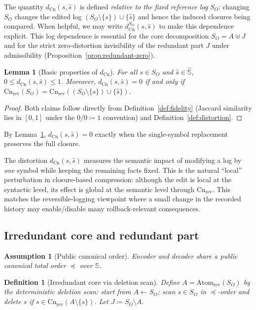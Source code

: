 \documentclass[twoside]{article}
\newtheorem{definition}[theorem]{Definition}
\newtheorem{lemma}[theorem]{Lemma}
\newtheorem{assumption}[theorem]{Assumption}
\newcommand{\Cn}{\mathrm{Cn}}
\newcommand{\Atom}{\mathrm{Atom}}
\newcommand{\1}{\mathbf{1}}
\begin{document}
The quantity \(d_{\Cn}(s,\hat s)\) is defined \emph{relative to the fixed reference log} \(S_O\): changing \(S_O\) changes the edited log
\((S_O\setminus\{s\})\cup\{\hat s\}\) and hence the induced closures being compared.
When helpful, we may write \(d_{\Cn}^{S_O}(s,\hat s)\) to make this dependence explicit.
This log dependence is essential for the core decomposition \(S_O=A\uplus J\) and for the strict zero-distortion invisibility of the redundant
part \(J\) under admissibility (Proposition~\ref{prop:redundant-zero}).

\begin{lemma}[Basic properties of \(d_{\Cn}\)]
\label{lem:dist-basic}
For all \(s\in S_O\) and \(\hat{s}\in\hat{\mathbb{S}}\), \(0\le d_{\Cn}(s,\hat{s})\le 1\).
Moreover, \(d_{\Cn}(s,\hat{s})=0\) if and only if
\(\Cn_{\mathrm{rev}}(S_O)=\Cn_{\mathrm{rev}}((S_O\setminus\{s\})\cup\{\hat{s}\})\).
\end{lemma}
\begin{proof}
Both claims follow directly from Definition~\ref{def:fidelity} (Jaccard similarity lies in \([0,1]\) under the \(0/0\coloneqq 1\) convention)
and Definition~\ref{def:distortion}.
\end{proof}

By Lemma~\ref{lem:dist-basic}, \(d_{\Cn}(s,\hat{s})=0\) exactly when the single-symbol replacement preserves the full closure.

The distortion \(d_{\Cn}(s,\hat{s})\) measures the semantic impact of modifying a log by \emph{one} symbol while keeping the remaining facts fixed.
This is the natural ``local'' perturbation in closure-based compression: although the edit is local at the syntactic level, its effect is global
at the semantic level through \(\Cn_{\mathrm{rev}}\). This matches the reversible-logging viewpoint where a small change in the recorded history
may enable/disable many rollback-relevant consequences.

\subsection{Irredundant core and redundant part}
\label{sec:core}

\begin{assumption}[Public canonical order]
\label{assm:order}
Encoder and decoder share a public canonical total order \(\preceq\) over \(\mathbb{S}\).
\end{assumption}

\begin{definition}[Irredundant core via deletion scan]
\label{def:core}
Define \(A=\Atom_{\mathrm{rev}}(S_O)\) by the deterministic deletion scan:
start from \(A\leftarrow S_O\); scan \(s\in S_O\) in \(\preceq\)-order and delete \(s\) if
\(s\in \Cn_{\mathrm{rev}}(A\setminus\{s\})\).
Let \(J\coloneqq S_O\setminus A\).
\end{definition}
\end{document}
